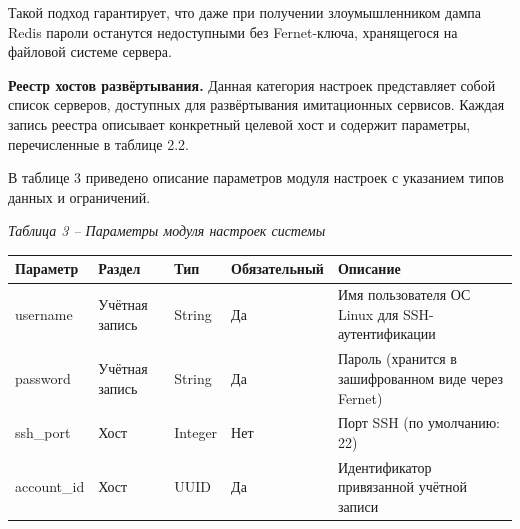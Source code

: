 \documentclass[
]{article}
\newcounter{none} %
\begin{document}
Такой подход гарантирует, что даже при получении злоумышленником дампа
Redis пароли останутся недоступными без Fernet-ключа, хранящегося на
файловой системе сервера.

\textbf{Реестр хостов развёртывания.} Данная категория настроек
представляет собой список серверов, доступных для развёртывания
имитационных сервисов. Каждая запись реестра описывает конкретный
целевой хост и содержит параметры, перечисленные в таблице 2.2.

В таблице 3 приведено описание параметров модуля настроек с указанием
типов данных и ограничений.

\emph{Таблица 3 -- Параметры модуля настроек системы}

{\def\LTcaptype{none} %
\begin{longtable}[]{@{}
  >{\raggedright\arraybackslash}p{}
  >{\raggedright\arraybackslash}p{}
  >{\raggedright\arraybackslash}p{}
  >{\raggedright\arraybackslash}p{}
  >{\raggedright\arraybackslash}p{}@{}}
\toprule\noalign{}
\begin{minipage}[b]{\linewidth}\centering
\textbf{Параметр}
\end{minipage} & \begin{minipage}[b]{\linewidth}\centering
\textbf{Раздел}
\end{minipage} & \begin{minipage}[b]{\linewidth}\centering
\textbf{Тип}
\end{minipage} & \begin{minipage}[b]{\linewidth}\centering
\textbf{Обязательный}
\end{minipage} & \begin{minipage}[b]{\linewidth}\centering
\textbf{Описание}
\end{minipage} \\
\midrule\noalign{}
\endhead
\bottomrule\noalign{}
\endlastfoot
username & Учётная запись & String & Да & Имя пользователя ОС Linux для
SSH-аутентификации \\
password & Учётная запись & String & Да & Пароль (хранится в
зашифрованном виде через Fernet) \\
ssh\_port & Хост & Integer & Нет & Порт SSH (по умолчанию: 22) \\
account\_id & Хост & UUID & Да & Идентификатор привязанной учётной
записи \\

\end{longtable}}
\end{document}
